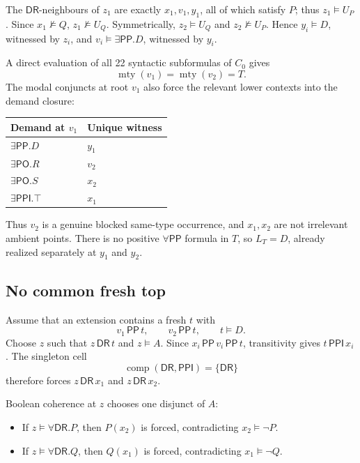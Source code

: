 \documentclass[11pt]{article}
\newcommand{\PP}{\mathsf{PP}}
\newcommand{\PPI}{\mathsf{PPI}}
\newcommand{\PO}{\mathsf{PO}}
\newcommand{\DR}{\mathsf{DR}}
\newcommand{\mty}{\operatorname{mty}}
\newcommand{\comp}{\operatorname{comp}}
\begin{document}
The $\DR$-neighbours of $z_1$ are exactly $x_1,v_1,y_1$, all of which satisfy $P$;
thus $z_1\models U_P$. Since $x_1\not\models Q$, $z_1\not\models U_Q$. Symmetrically,
$z_2\models U_Q$ and $z_2\not\models U_P$. Hence $y_i\models D$, witnessed by $z_i$,
and $v_i\models\exists\PP.D$, witnessed by $y_i$.

A direct evaluation of all 22 syntactic subformulas of $C_0$ gives
\[
  \mty(v_1)=\mty(v_2)=T.
\]
The modal conjuncts at root $v_1$ also force the relevant lower contexts into the demand
closure:

\begin{center}
\begin{tabular}{ll}
\toprule
Demand at $v_1$ & Unique witness \\
\midrule
$\exists\PP.D$ & $y_1$ \\
$\exists\PO.R$ & $v_2$ \\
$\exists\PO.S$ & $x_2$ \\
$\exists\PPI.\top$ & $x_1$ \\
\bottomrule
\end{tabular}
\end{center}

Thus $v_2$ is a genuine blocked same-type occurrence, and $x_1,x_2$ are not irrelevant
ambient points. There is no positive $\forall\PP$ formula in $T$, so $L_T=D$, already
realized separately at $y_1$ and $y_2$.

\subsection{No common fresh top}

Assume that an extension contains a fresh $t$ with
\[
  v_1\,\PP\,t,\qquad v_2\,\PP\,t,\qquad t\models D.
\]
Choose $z$ such that $z\,\DR\,t$ and $z\models A$. Since $x_i\,\PP\,v_i\,\PP\,t$,
transitivity gives $t\,\PPI\,x_i$. The singleton cell
\[
  \comp(\DR,\PPI)=\{\DR\}
\]
therefore forces $z\,\DR\,x_1$ and $z\,\DR\,x_2$.

Boolean coherence at $z$ chooses one disjunct of $A$:

\begin{itemize}
  \item If $z\models\forall\DR.P$, then $P(x_2)$ is forced, contradicting
        $x_2\models\neg P$.
  \item If $z\models\forall\DR.Q$, then $Q(x_1)$ is forced, contradicting
        $x_1\models\neg Q$.
\end{itemize}
\end{document}
